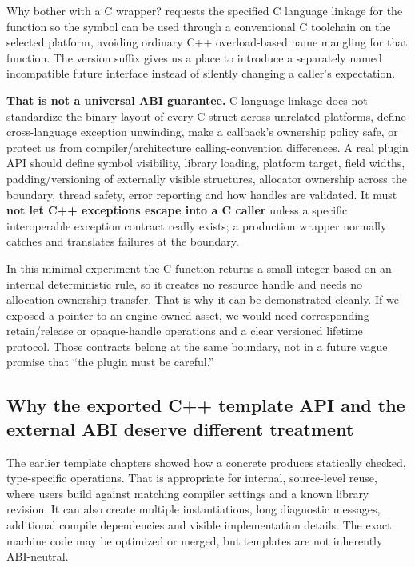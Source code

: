 Why bother with a C wrapper?  requests the specified C language linkage for the function so the symbol can be used through a conventional C toolchain on the selected platform, avoiding ordinary C++ overload-based name mangling for that function. The version suffix  gives us a place to introduce a separately named incompatible future interface instead of silently changing a caller's expectation.

\textbf{That is not a universal ABI guarantee.} C language linkage does not standardize the binary layout of every C struct across unrelated platforms, define cross-language exception unwinding, make a callback's ownership policy safe, or protect us from compiler/architecture calling-convention differences. A real plugin API should define symbol visibility, library loading, platform target, field widths, padding/versioning of externally visible structures, allocator ownership across the boundary, thread safety, error reporting and how handles are validated. It must \textbf{not let C++ exceptions escape into a C caller} unless a specific interoperable exception contract really exists; a production wrapper normally catches and translates failures at the boundary.

In this minimal experiment the C function returns a small integer based on an internal deterministic rule, so it creates no resource handle and needs no allocation ownership transfer. That is why it can be demonstrated cleanly. If we exposed a pointer to an engine-owned asset, we would need corresponding retain/release or opaque-handle operations and a clear versioned lifetime protocol. Those contracts belong at the same boundary, not in a future vague promise that ``the plugin must be careful.''

\subsection{Why the exported C++ template API and the external ABI deserve different treatment}\label{05-engine-i-ch006-why-the-exported-c-template-api-and-the-external-abi-deserve-different-treatment}

\hypertarget{05-engine-i-ch006-why-the-exported-c-template-api-and-the-external-abi-deserve-different-treatment}{}

The earlier template chapters showed how a concrete  produces statically checked, type-specific operations. That is appropriate for internal, source-level reuse, where users build against matching compiler settings and a known library revision. It can also create multiple instantiations, long diagnostic messages, additional compile dependencies and visible implementation details. The exact machine code may be optimized or merged, but templates are not inherently ABI-neutral.

